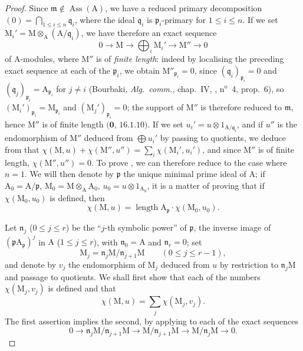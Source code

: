 \begin{proof}
Since $\mathfrak{m}\notin\operatorname{Ass}(\mathrm{A})$, we have a reduced primary decomposition $(0)=\bigcap_{1\leq i\leq n}\mathfrak{q}_i$, where the ideal $\mathfrak{q}_i$ is $\mathfrak{p}_i$-primary for $1\leq i\leq n$.
If we set $\mathrm{M}_i'=\mathrm{M}\otimes_{\mathrm{A}}(\mathrm{A}/\mathfrak{q}_i)$, we have therefore an exact sequence
\[
  0\to\mathrm{M}\to\bigoplus_i\mathrm{M}_i'\to\mathrm{M}''\to 0
\]
of A-modules, where $\mathrm{M}''$ is of \emph{finite length}: indeed by localising the preceding exact sequence at each of the $\mathfrak{p}_i$, we obtain $\mathrm{M}''_{\mathfrak{p}_i}=0$, since $(\mathfrak{q}_i)_{\mathfrak{p}_i}=0$ and $(\mathfrak{q}_j)_{\mathfrak{p}_i}=\mathrm{A}_{\mathfrak{p}_i}$ for $j\neq i$ (Bourbaki, \emph{Alg.\ comm.}, chap.~IV, , n$^{\mathrm{o}}$~4, prop.~6), so $(\mathrm{M}_i')_{\mathfrak{p}_i}=\mathrm{M}_{\mathfrak{p}_i}$ and $(\mathrm{M}_j')_{\mathfrak{p}_i}=0$; the support of $\mathrm{M}''$ is therefore reduced to $\mathfrak{m}$, hence $\mathrm{M}''$ is of finite length $(\mathbf{0}$, $16.1.10)$.
If we set $u_i'=u\otimes 1_{\mathrm{A}/\mathfrak{q}_i}$, and if $u''$ is the endomorphism of $\mathrm{M}''$ deduced from $\bigoplus u_i'$ by passing to quotients, we deduce from  that $\chi(\mathrm{M},u)+\chi(\mathrm{M}'',u'')=\sum_i\chi(\mathrm{M}_i',u_i')$, and since $\mathrm{M}''$ is of finite length, $\chi(\mathrm{M}'',u'')=0$.
To prove , we can therefore reduce to the case where $n=1$.
We will then denote by $\mathfrak{p}$ the unique minimal prime ideal of $\mathrm{A}$; if $\mathrm{A}_0=\mathrm{A}/\mathfrak{p}$, $\mathrm{M}_0=\mathrm{M}\otimes_{\mathrm{A}}\mathrm{A}_0$, $u_0=u\otimes 1_{\mathrm{A}_0}$, it is a matter of proving that if $\chi(\mathrm{M}_0,u_0)$ is defined, then
\[
\label{IV.21.10.17.9}
  \chi(\mathrm{M},u)=\operatorname{length}\mathrm{A}_{\mathfrak{p}}\cdot\chi(\mathrm{M}_0,u_0).
  \tag{21.10.17.9}
\]

Let $\mathfrak{n}_j$ ($0\leq j\leq r$) be the ``$j$-th symbolic power'' of $\mathfrak{p}$, the inverse image of $(\mathfrak{p}\mathrm{A}_{\mathfrak{p}})^j$ in $\mathrm{A}$ ($1\leq j\leq r$), with $\mathfrak{n}_0=\mathrm{A}$ and $\mathfrak{n}_r=0$; set
\[
  \mathrm{M}_j=\mathfrak{n}_j\mathrm{M}/\mathfrak{n}_{j+1}\mathrm{M}\qquad(0\leq j\leq r-1),
\]
and denote by $v_j$ the endomorphism of $\mathrm{M}_j$ deduced from $u$ by restriction to $\mathfrak{n}_j\mathrm{M}$ and passage to quotients.
We shall first show that each of the numbers $\chi(\mathrm{M}_j,v_j)$ is defined and that
\[
\label{IV.21.10.17.10}
  \chi(\mathrm{M},u)=\sum_j\chi(\mathrm{M}_j,v_j).
  \tag{21.10.17.10}
\]
The first assertion implies the second, by applying  to each of the exact sequences
\[
  0\to\mathfrak{n}_j\mathrm{M}/\mathfrak{n}_{j+1}\mathrm{M}\to\mathrm{M}/\mathfrak{n}_{j+1}\mathrm{M}\to\mathrm{M}/\mathfrak{n}_j\mathrm{M}\to 0.
\]


\end{proof}
